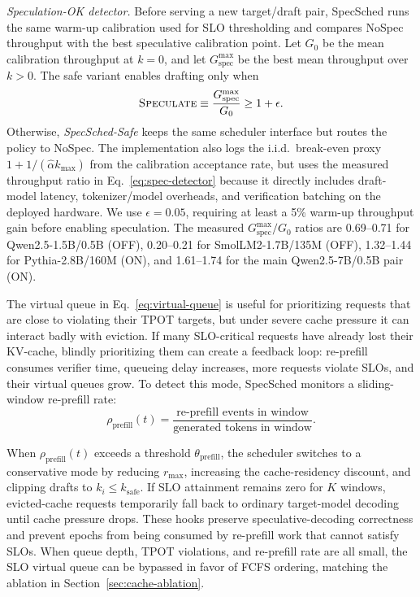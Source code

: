 \documentclass[journal]{IEEEtran}
\newcommand{\system}{SpecSched}
\begin{document}
\textit{Speculation-OK detector.}
Before serving a new target/draft pair, \system{} runs the same warm-up
calibration used for SLO thresholding and compares NoSpec throughput
with the best speculative calibration point. Let $G_0$ be the mean
calibration throughput at $k=0$, and let $G_{\mathrm{spec}}^{\max}$
be the best mean throughput over $k>0$. The safe variant enables
drafting only when
\begin{equation}
    \label{eq:spec-detector}
    \textsc{Speculate} \equiv
    \frac{G_{\mathrm{spec}}^{\max}}{G_0}
    \geq 1 + \epsilon .
\end{equation}
Otherwise, \textit{\system{}-Safe} keeps the same scheduler interface
but routes the policy to NoSpec. The implementation also logs the
i.i.d.\ break-even proxy
$1 + 1/(\hat{\alpha} k_{\max})$ from the calibration acceptance rate,
but uses the measured throughput ratio in Eq.~\eqref{eq:spec-detector}
because it directly includes draft-model latency, tokenizer/model
overheads, and verification batching on the deployed hardware.
We use $\epsilon=0.05$, requiring at least a 5\% warm-up throughput
gain before enabling speculation. The measured
$G_{\mathrm{spec}}^{\max}/G_0$ ratios are 0.69--0.71 for
Qwen2.5-1.5B/0.5B (OFF), 0.20--0.21 for SmolLM2-1.7B/135M (OFF),
1.32--1.44 for Pythia-2.8B/160M (ON), and 1.61--1.74 for the main
Qwen2.5-7B/0.5B pair (ON).

The virtual queue in Eq.~\eqref{eq:virtual-queue} is useful for
prioritizing requests that are close to violating their TPOT
targets, but under severe cache pressure it can interact badly
with eviction. If many SLO-critical requests have already lost
their KV-cache, blindly prioritizing them can create a feedback
loop: re-prefill consumes verifier time, queueing delay increases,
more requests violate SLOs, and their virtual queues grow. To
detect this mode, \system{} monitors a sliding-window re-prefill
rate:
\begin{equation}
    \label{eq:reprefill-rate}
    \rho_{\text{prefill}}(t) =
    \frac{\text{re-prefill events in window}}
    {\text{generated tokens in window}}.
\end{equation}

When $\rho_{\text{prefill}}(t)$ exceeds a threshold
$\theta_{\text{prefill}}$, the scheduler switches to a
conservative mode by reducing $r_{\max}$, increasing the
cache-residency discount, and clipping drafts to
$k_i \leq k_{\text{safe}}$. If SLO attainment remains zero for
$K$ windows, evicted-cache requests temporarily fall back to
ordinary target-model decoding until cache pressure drops. These
hooks preserve speculative-decoding correctness and prevent epochs
from being consumed by re-prefill work that cannot satisfy SLOs.
When queue depth, TPOT violations, and re-prefill rate are all small,
the SLO virtual queue can be bypassed in favor of FCFS ordering,
matching the ablation in Section~\ref{sec:cache-ablation}.
\end{document}
